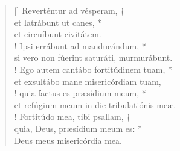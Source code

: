 \begin{verse}[\versewidth]
\vin Reverténtur ad vésperam, †\\
\vin et latrábunt ut canes, *\\
\vin et circuíbunt civitátem.\\!
Ipsi errábunt ad manducándum, *\\
si vero non fúerint saturáti, murmurábunt.\\!
\vin Ego autem cantábo fortitúdinem tuam, *\\
\vin et exsultábo mane misericórdiam tuam,\\!
quia factus es præsídium meum, *\\
et refúgium meum in die tribulatiónis meæ.\\!
\vin Fortitúdo mea, tibi psallam, †\\
\vin quia, Deus, præsídium meum es: *\\
\vin Deus meus misericórdia mea.\\
\end{verse}
\vspace{1cm}


